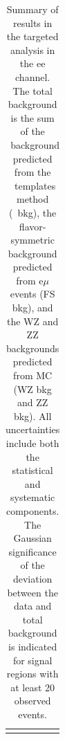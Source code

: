 \begin{table}[htb]
\begin{center}
\footnotesize
\caption{\label{tab:results_targ_ee}\footnotesize Summary of results in the targeted analysis in the ee channel. The total background is the sum of the \zjets\ background predicted from
the \MET\ templates method (\zjets\ bkg), the flavor-symmetric background predicted from e$\mu$ events (FS bkg), and the WZ and ZZ backgrounds predicted from MC
(WZ bkg and ZZ bkg). All uncertainties include both the statistical and systematic components. The Gaussian significance of the deviation between the data 
and total background is indicated for signal regions with at least 20 observed events. }
\begin{tabular}{l|c|c|c|c}

\hline
\hline

\end{tabular}
\end{center}
\end{table}
